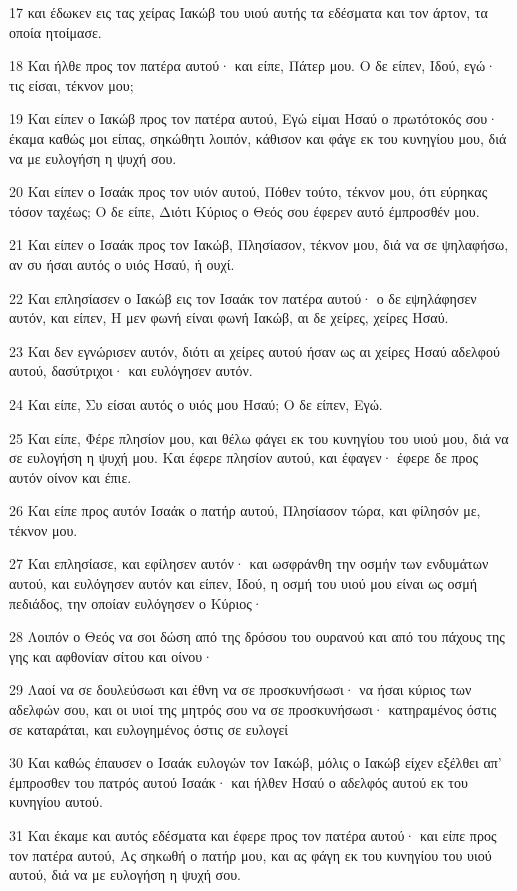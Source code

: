 \par 17 και έδωκεν εις τας χείρας Ιακώβ του υιού αυτής τα εδέσματα και τον άρτον, τα οποία ητοίμασε.
\par 18 Και ήλθε προς τον πατέρα αυτού· και είπε, Πάτερ μου. Ο δε είπεν, Ιδού, εγώ· τις είσαι, τέκνον μου;
\par 19 Και είπεν ο Ιακώβ προς τον πατέρα αυτού, Εγώ είμαι Ησαύ ο πρωτότοκός σου· έκαμα καθώς μοι είπας, σηκώθητι λοιπόν, κάθισον και φάγε εκ του κυνηγίου μου, διά να με ευλογήση η ψυχή σου.
\par 20 Και είπεν ο Ισαάκ προς τον υιόν αυτού, Πόθεν τούτο, τέκνον μου, ότι εύρηκας τόσον ταχέως; Ο δε είπε, Διότι Κύριος ο Θεός σου έφερεν αυτό έμπροσθέν μου.
\par 21 Και είπεν ο Ισαάκ προς τον Ιακώβ, Πλησίασον, τέκνον μου, διά να σε ψηλαφήσω, αν συ ήσαι αυτός ο υιός Ησαύ, ή ουχί.
\par 22 Και επλησίασεν ο Ιακώβ εις τον Ισαάκ τον πατέρα αυτού· ο δε εψηλάφησεν αυτόν, και είπεν, Η μεν φωνή είναι φωνή Ιακώβ, αι δε χείρες, χείρες Ησαύ.
\par 23 Και δεν εγνώρισεν αυτόν, διότι αι χείρες αυτού ήσαν ως αι χείρες Ησαύ αδελφού αυτού, δασύτριχοι· και ευλόγησεν αυτόν.
\par 24 Και είπε, Συ είσαι αυτός ο υιός μου Ησαύ; Ο δε είπεν, Εγώ.
\par 25 Και είπε, Φέρε πλησίον μου, και θέλω φάγει εκ του κυνηγίου του υιού μου, διά να σε ευλογήση η ψυχή μου. Και έφερε πλησίον αυτού, και έφαγεν· έφερε δε προς αυτόν οίνον και έπιε.
\par 26 Και είπε προς αυτόν Ισαάκ ο πατήρ αυτού, Πλησίασον τώρα, και φίλησόν με, τέκνον μου.
\par 27 Και επλησίασε, και εφίλησεν αυτόν· και ωσφράνθη την οσμήν των ενδυμάτων αυτού, και ευλόγησεν αυτόν και είπεν, Ιδού, η οσμή του υιού μου είναι ως οσμή πεδιάδος, την οποίαν ευλόγησεν ο Κύριος·
\par 28 Λοιπόν ο Θεός να σοι δώση από της δρόσου του ουρανού και από του πάχους της γης και αφθονίαν σίτου και οίνου·
\par 29 Λαοί να σε δουλεύσωσι και έθνη να σε προσκυνήσωσι· να ήσαι κύριος των αδελφών σου, και οι υιοί της μητρός σου να σε προσκυνήσωσι· κατηραμένος όστις σε καταράται, και ευλογημένος όστις σε ευλογεί
\par 30 Και καθώς έπαυσεν ο Ισαάκ ευλογών τον Ιακώβ, μόλις ο Ιακώβ είχεν εξέλθει απ' έμπροσθεν του πατρός αυτού Ισαάκ· και ήλθεν Ησαύ ο αδελφός αυτού εκ του κυνηγίου αυτού.
\par 31 Και έκαμε και αυτός εδέσματα και έφερε προς τον πατέρα αυτού· και είπε προς τον πατέρα αυτού, Ας σηκωθή ο πατήρ μου, και ας φάγη εκ του κυνηγίου του υιού αυτού, διά να με ευλογήση η ψυχή σου.
